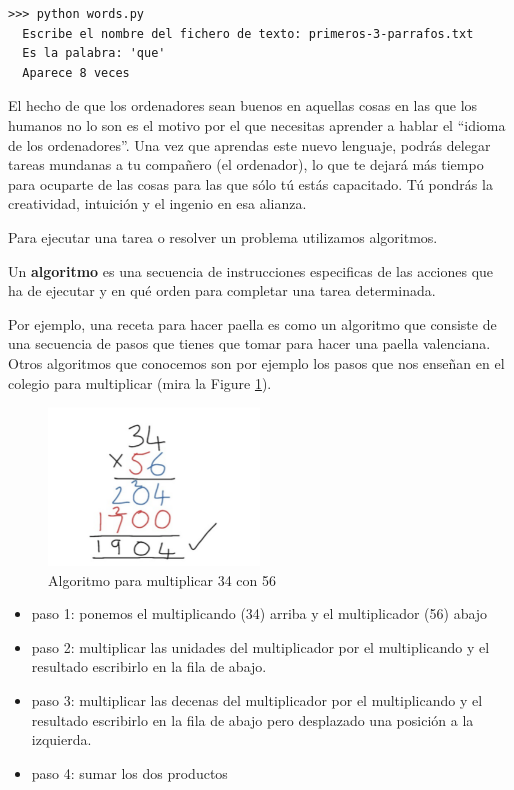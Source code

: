 \begin{Verbatim}[frame=single]
>>> python words.py
  Escribe el nombre del fichero de texto: primeros-3-parrafos.txt
  Es la palabra: 'que'
  Aparece 8 veces
\end{Verbatim}


El hecho de que los ordenadores sean buenos en aquellas cosas en las que
los humanos no lo son es el motivo por el que necesitas aprender a
hablar el ``idioma de los ordenadores''. Una vez que aprendas este nuevo
lenguaje, podrás delegar tareas mundanas a tu compañero (el ordenador),
lo que te dejará más tiempo para ocuparte de las cosas para las que sólo
tú estás capacitado. Tú pondrás la creatividad, intuición y el ingenio
en esa alianza.

Para ejecutar una tarea o resolver un problema utilizamos algoritmos. 

\begin{definition}
Un \textbf{algoritmo} es una secuencia de instrucciones especificas de las acciones
que ha de ejecutar y en qué orden para completar una tarea determinada.
\end{definition}

Por ejemplo, una receta para hacer paella es como un algoritmo que
consiste de una secuencia de pasos que tienes que tomar para hacer una
paella valenciana.
%
Otros algoritmos que conocemos son por ejemplo los pasos que nos enseñan
en el colegio para multiplicar (mira la Figure \ref{fig:multiplicar}). 

\begin{figure}
    \centering
    \includegraphics[width=0.5\textwidth]{images/multiplicar.pdf}
    \caption{Algoritmo para multiplicar 34 con 56}
    \label{fig:multiplicar}
\end{figure}


\begin{itemize}[nosep]
\item
  paso 1: ponemos el multiplicando (34) arriba y el multiplicador (56)
  abajo
\item
  paso 2: multiplicar las unidades del multiplicador por el
  multiplicando y el resultado escribirlo en la fila de abajo.
\item
  paso 3: multiplicar las decenas del multiplicador por el multiplicando
  y el resultado escribirlo en la fila de abajo pero desplazado una
  posición a la izquierda.
\item
  paso 4: sumar los dos productos
\end{itemize}

